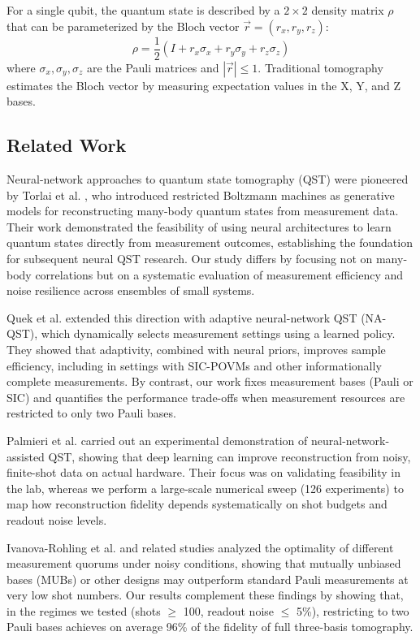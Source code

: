 \documentclass[conference]{IEEEtran}
\begin{document}
For a single qubit, the quantum state is described by a $2 \times 2$ density matrix $\rho$ that can be parameterized by the Bloch vector $\vec{r} = (r_x, r_y, r_z)$:
\begin{equation}
\rho = \frac{1}{2}(I + r_x\sigma_x + r_y\sigma_y + r_z\sigma_z)
\end{equation}
where $\sigma_x, \sigma_y, \sigma_z$ are the Pauli matrices and $|\vec{r}| \leq 1$. Traditional tomography estimates the Bloch vector by measuring expectation values in the X, Y, and Z bases.

\subsection{Related Work}

Neural-network approaches to quantum state tomography (QST) were pioneered by Torlai et al. \cite{torlai2018neural}, who introduced restricted Boltzmann machines as generative models for reconstructing many-body quantum states from measurement data. Their work demonstrated the feasibility of using neural architectures to learn quantum states directly from measurement outcomes, establishing the foundation for subsequent neural QST research. Our study differs by focusing not on many-body correlations but on a systematic evaluation of measurement efficiency and noise resilience across ensembles of small systems.

Quek et al. \cite{quek2018adaptive} extended this direction with adaptive neural-network QST (NA-QST), which dynamically selects measurement settings using a learned policy. They showed that adaptivity, combined with neural priors, improves sample efficiency, including in settings with SIC-POVMs and other informationally complete measurements. By contrast, our work fixes measurement bases (Pauli or SIC) and quantifies the performance trade-offs when measurement resources are restricted to only two Pauli bases.

Palmieri et al. \cite{palmieri2020experimental} carried out an experimental demonstration of neural-network-assisted QST, showing that deep learning can improve reconstruction from noisy, finite-shot data on actual hardware. Their focus was on validating feasibility in the lab, whereas we perform a large-scale numerical sweep (126 experiments) to map how reconstruction fidelity depends systematically on shot budgets and readout noise levels.

Ivanova-Rohling et al. \cite{ivanova2023optimal} and related studies analyzed the optimality of different measurement quorums under noisy conditions, showing that mutually unbiased bases (MUBs) or other designs may outperform standard Pauli measurements at very low shot numbers. Our results complement these findings by showing that, in the regimes we tested (shots $\geq$ 100, readout noise $\leq$ 5\%), restricting to two Pauli bases achieves on average 96\% of the fidelity of full three-basis tomography.
\end{document}
